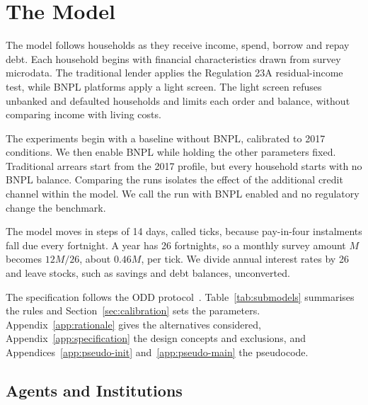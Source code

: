 \section{The Model}
\label{sec:model}

The model follows households as they receive income, spend, borrow and repay debt.
Each household begins with financial characteristics drawn from survey microdata.
The traditional lender applies the Regulation 23A residual-income test,
while \ac{BNPL} platforms apply a light screen. The light screen refuses unbanked and defaulted households
and limits each order and balance, without comparing income with living costs.

\label{sec:purpose}
The experiments begin with a baseline without \ac{BNPL}, calibrated to 2017
conditions. We then enable \ac{BNPL} while holding the other parameters fixed.
Traditional arrears start from the 2017 profile, but every household starts with no
\ac{BNPL} balance. Comparing the runs isolates the effect of the
additional credit channel within the model. We call the run with \ac{BNPL}
enabled and no regulatory change the benchmark.

The model moves in steps of 14 days, called ticks, because pay-in-four instalments fall due
every fortnight. A year has 26 fortnights, so a monthly survey amount $M$ becomes $12M/26$,
about $0.46M$, per tick. We divide annual
interest rates by 26 and leave stocks, such as savings and debt balances, unconverted.

The specification follows the \ac{ODD} protocol~\citep{grimm2006odd,grimm2020odd}.
Table~\ref{tab:submodels} summarises the rules and Section~\ref{sec:calibration} sets the
parameters. Appendix~\ref{app:rationale} gives the alternatives considered,
Appendix~\ref{app:specification} the design concepts and exclusions, and
Appendices~\ref{app:pseudo-init} and~\ref{app:pseudo-main} the pseudocode.

\subsection{Agents and Institutions}
\label{sec:entities}

